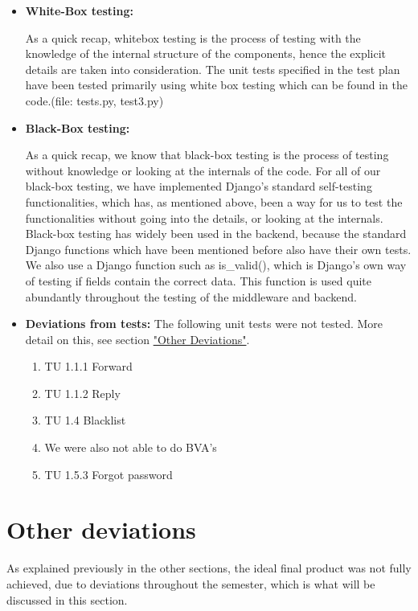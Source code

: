 \documentclass{article}
\begin{document}
\begin{itemize}
    \item \textbf{White-Box testing:}
    
    As a quick recap, whitebox testing is the process of testing with the knowledge of the internal structure of the components, hence the explicit details are taken into consideration. The unit tests specified in the test plan have been tested primarily using white box testing which can be found in the code.(file: tests.py, test3.py)
    \item \textbf{Black-Box testing:}
    
    As a quick recap, we know that black-box testing is the process of testing without knowledge or looking at the internals of the code. For all of our black-box testing, we have implemented Django's standard self-testing functionalities, which has, as mentioned above, been a way for us to test the functionalities without going into the details, or looking at the internals. Black-box testing has widely been used in the backend, because the standard Django functions which have been mentioned before also have their own tests. We also use a Django function such as is\_valid(), which is Django's own way of testing if fields contain the correct data. This function is used quite abundantly throughout the testing of the middleware and backend.
    
    \item \textbf{Deviations from tests:}
    The following unit tests were not tested. More detail on this, see section \hyperref[sec:deviations]{"Other Deviations"}.
    \begin{enumerate}
        \item TU 1.1.1 Forward
        \item TU 1.1.2 Reply
        \item TU 1.4 Blacklist
        \item We were also not able to do BVA's
        \item TU 1.5.3 Forgot password
    \end{enumerate}
\end{itemize}

\newpage

\section*{Other deviations}

\label{sec:deviations}
As explained previously in the other sections, the ideal final product was not fully achieved, due to deviations throughout the semester, which is what will be discussed in this section.
\end{document}
